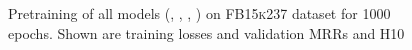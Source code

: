 \begin{figure}
\begin{minipage}{.3\textwidth}
    \end{minipage}%
    \caption{Pretraining of all models (\distmult, \complex, \transe, \transd) on \textsc{FB15k237} dataset for 1000 epochs.
    Shown are training losses and validation MRRs and H\@10}
    \label{fig:test}
\end{figure}



